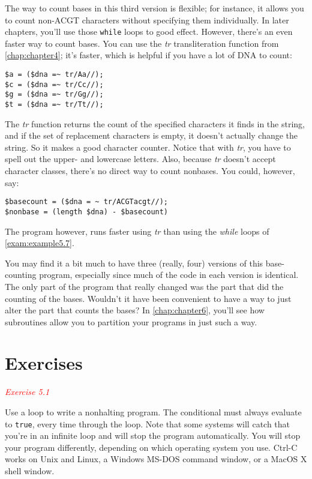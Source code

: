 The way to count bases in this third version is flexible; for instance, it allows you to count non-ACGT characters without specifying them individually. In later chapters, you'll use those \verb|while| loops to good effect. However, there's an even faster way to count bases. You can use the \textit{tr} transliteration function from \autoref{chap:chapter4}; it's faster, which is helpful if you have a lot of DNA to count: 

\begin{lstlisting}
$a = ($dna =~ tr/Aa//);
$c = ($dna =~ tr/Cc//);
$g = ($dna =~ tr/Gg//);
$t = ($dna =~ tr/Tt//);
\end{lstlisting}

The \textit{tr} function returns the count of the specified characters it finds in the string, and if the set of replacement characters is empty, it doesn't actually change the string. So it makes a good character counter. Notice that with \textit{tr}, you have to spell out the upper- and lowercase letters. Also, because \textit{tr} doesn't accept character classes, there's no direct way to count nonbases. You could, however, say: 

\begin{lstlisting}
$basecount = ($dna = ~ tr/ACGTacgt//);
$nonbase = (length $dna) - $basecount)
\end{lstlisting}

The program however, runs faster using \textit{tr} than using the \textit{while} loops of \autoref{exam:example5.7}.

You may find it a bit much to have three (really, four) versions of this base-counting program, especially since much of the code in each version is identical. The only part of the program that really changed was the part that did the counting of the bases. Wouldn't it have been convenient to have a way to just alter the part that counts the bases? In \autoref{chap:chapter6}, you'll see how subroutines allow you to partition your programs in just such a way. 

\section{Exercises}
\textcolor{red}{\textit{Exercise 5.1}}
\begin{adjustwidth}{1cm}{}
Use a loop to write a nonhalting program. The conditional must always evaluate to \verb|true|, every time through the loop. Note that some systems will catch that you're in an infinite loop and will stop the program automatically. You will stop your program differently, depending on which operating system you use. Ctrl-C works on Unix and Linux, a Windows MS-DOS command window, or a MacOS X shell window. 
\end{adjustwidth}

